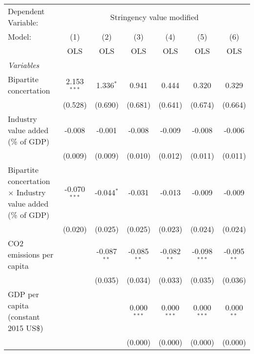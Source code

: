
\begingroup
\centering
\begin{tabular}{lcccccc}
   \toprule
   Dependent Variable: & \multicolumn{6}{c}{Stringency value modified}\\
   Model:                                                             & (1)            & (2)           & (3)           & (4)           & (5)            & (6)\\  
                                                                      &  OLS           & OLS           & OLS           & OLS           & OLS            & OLS\\  
   \midrule
   \emph{Variables}\\
   Bipartite concertation                                             & 2.153$^{***}$  & 1.336$^{*}$   & 0.941         & 0.444         & 0.320          & 0.329\\   
                                                                      & (0.528)        & (0.690)       & (0.681)       & (0.641)       & (0.674)        & (0.664)\\   
   Industry value added (\% of GDP)                                   & -0.008         & -0.001        & -0.008        & -0.009        & -0.008         & -0.006\\   
                                                                      & (0.009)        & (0.009)       & (0.010)       & (0.012)       & (0.011)        & (0.011)\\   
   Bipartite concertation $\times$ Industry value added (\% of GDP)   & -0.070$^{***}$ & -0.044$^{*}$  & -0.031        & -0.013        & -0.009         & -0.009\\   
                                                                      & (0.020)        & (0.025)       & (0.025)       & (0.023)       & (0.024)        & (0.024)\\   
   CO2 emissions per capita                                           &                & -0.087$^{**}$ & -0.085$^{**}$ & -0.082$^{**}$ & -0.098$^{***}$ & -0.095$^{**}$\\   
                                                                      &                & (0.035)       & (0.034)       & (0.033)       & (0.035)        & (0.036)\\   
   GDP per capita (constant 2015 US\$)                                &                &               & 0.000$^{***}$ & 0.000$^{***}$ & 0.000$^{***}$  & 0.000$^{**}$\\   
                                                                      &                &               & (0.000)       & (0.000)       & (0.000)        & (0.000)\\   

\end{tabular}
